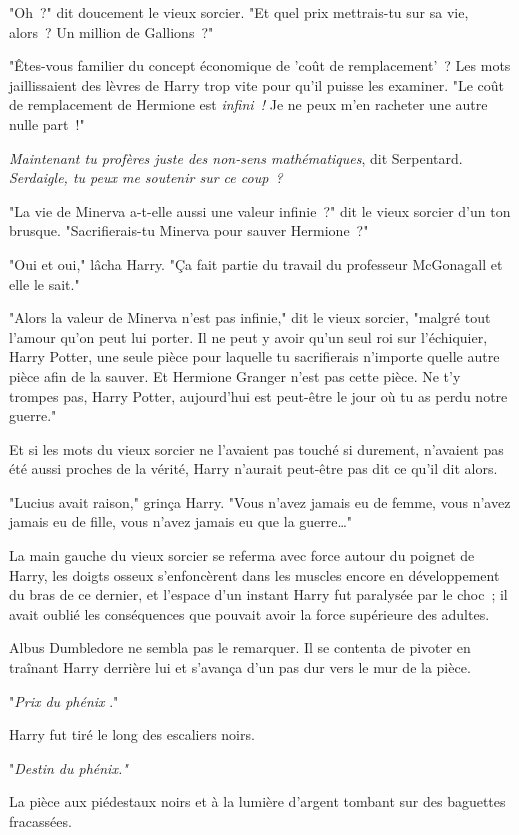 "Oh~?" dit doucement le vieux sorcier. "Et quel prix mettrais-tu sur sa vie, alors~? Un million de Gallions~?"

"Êtes-vous familier du concept économique de 'coût de remplacement'~? Les mots jaillissaient des lèvres de Harry trop vite pour qu'il puisse les examiner. "Le coût de remplacement de Hermione est \emph{infini~!} Je ne peux m'en racheter une autre nulle part~!"

\emph{Maintenant tu profères juste des non-sens mathématiques}, dit Serpentard. \emph{Serdaigle, tu peux me soutenir sur ce coup~?}

"La vie de Minerva a-t-elle aussi une valeur infinie~?" dit le vieux sorcier d'un ton brusque. "Sacrifierais-tu Minerva pour sauver Hermione~?"

"Oui et oui," lâcha Harry. "Ça fait partie du travail du professeur McGonagall et elle le sait."

"Alors la valeur de Minerva n'est pas infinie," dit le vieux sorcier, "malgré tout l'amour qu'on peut lui porter. Il ne peut y avoir qu'un seul roi sur l'échiquier, Harry Potter, une seule pièce pour laquelle tu sacrifierais n'importe quelle autre pièce afin de la sauver. Et Hermione Granger n'est pas cette pièce. Ne t'y trompes pas, Harry Potter, aujourd'hui est peut-être le jour où tu as perdu notre guerre."

Et si les mots du vieux sorcier ne l'avaient pas touché si durement, n'avaient pas été aussi proches de la vérité, Harry n'aurait peut-être pas dit ce qu'il dit alors.

"Lucius avait raison," grinça Harry. "Vous n'avez jamais eu de femme, vous n'avez jamais eu de fille, vous n'avez jamais eu que la guerre…"

La main gauche du vieux sorcier se referma avec force autour du poignet de Harry, les doigts osseux s'enfoncèrent dans les muscles encore en développement du bras de ce dernier, et l'espace d'un instant Harry fut paralysée par le choc~; il avait oublié les conséquences que pouvait avoir la force supérieure des adultes.

Albus Dumbledore ne sembla pas le remarquer. Il se contenta de pivoter en traînant Harry derrière lui et s'avança d'un pas dur vers le mur de la pièce.

"\emph{Prix du phénix} ."

Harry fut tiré le long des escaliers noirs.

"\emph{Destin du phénix."}

La pièce aux piédestaux noirs et à la lumière d'argent tombant sur des baguettes fracassées.

